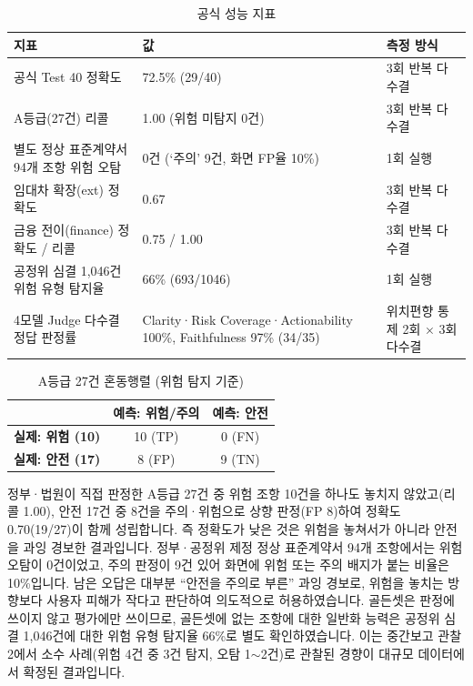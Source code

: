 \documentclass[10pt,a4paper]{article}
\newcommand{\tsz}{\fontsize{9.2}{12}\selectfont}
\begin{document}
\begin{table}[!htbp]\centering\tsz
\caption{공식 성능 지표}\label{tab:perf}
\begin{tabularx}{\textwidth}{L{5.3cm} Y L{3.3cm}}
\toprule
\textbf{지표} & \textbf{값} & \textbf{측정 방식}\\
\midrule
공식 Test 40 정확도 & 72.5\% (29/40) & 3회 반복 다수결\\
A등급(27건) 리콜 & 1.00 (위험 미탐지 0건) & 3회 반복 다수결\\
별도 정상 표준계약서 94개 조항 위험 오탐 & 0건 (`주의' 9건, 화면 FP율 10\%) & 1회 실행\\
임대차 확장(ext) 정확도 & 0.67 & 3회 반복 다수결\\
금융 전이(finance) 정확도 / 리콜 & 0.75 / 1.00 & 3회 반복 다수결\\
공정위 심결 1,046건 위험 유형 탐지율 & 66\% (693/1046) & 1회 실행\\
4모델 Judge 다수결 정답 판정률\footnotemark & Clarity·Risk Coverage·Actionability 100\%, Faithfulness 97\% (34/35) & 위치편향 통제 2회 × 3회 다수결\\
\bottomrule
\end{tabularx}
\end{table}

\begin{table}[!htbp]\centering\tsz
\caption{A등급 27건 혼동행렬 (위험 탐지 기준)}\label{tab:confusion}
\begin{tabular}{lcc}
\toprule
 & \textbf{예측: 위험/주의} & \textbf{예측: 안전}\\
\midrule
\textbf{실제: 위험 (10)} & 10 (TP) & 0 (FN)\\
\textbf{실제: 안전 (17)} & 8 (FP) & 9 (TN)\\
\bottomrule
\end{tabular}
\end{table}

정부·법원이 직접 판정한 A등급 27건 중 위험 조항 10건을 하나도 놓치지 않았고(리콜 1.00), 안전 17건 중 8건을 주의·위험으로 상향 판정(FP 8)하여 정확도 0.70(19/27)이 함께 성립합니다. 즉 정확도가 낮은 것은 위험을 놓쳐서가 아니라 안전을 과잉 경보한 결과입니다. 정부·공정위 제정 정상 표준계약서 94개 조항에서는 위험 오탐이 0건이었고, 주의 판정이 9건 있어 화면에 위험 또는 주의 배지가 붙는 비율은 10\%입니다. 남은 오답은 대부분 ``안전을 주의로 부른'' 과잉 경보로, 위험을 놓치는 방향보다 사용자 피해가 작다고 판단하여 의도적으로 허용하였습니다. 골든셋은 판정에 쓰이지 않고 평가에만 쓰이므로, 골든셋에 없는 조항에 대한 일반화 능력은 공정위 심결 1,046건에 대한 위험 유형 탐지율 66\%로 별도 확인하였습니다. 이는 중간보고 관찰 2에서 소수 사례(위험 4건 중 3건 탐지, 오탐 1$\sim$2건)로 관찰된 경향이 대규모 데이터에서 확정된 결과입니다.
\end{document}
